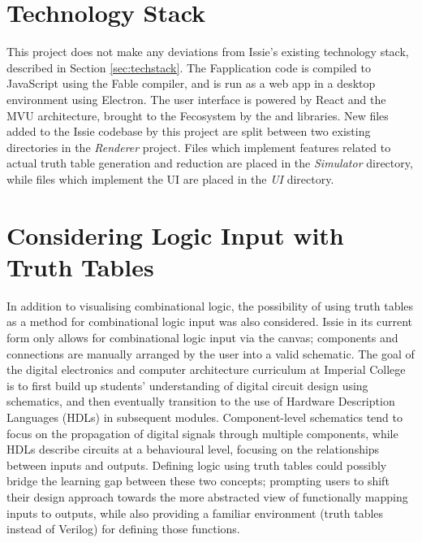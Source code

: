 \section{Technology Stack}
This project does not make any deviations from Issie's existing technology stack, described in Section \ref{sec:techstack}. The F\fsharp application code is compiled to JavaScript using the Fable compiler, and is run as a web app in a desktop environment using Electron. The user interface is powered by React and the MVU architecture, brought to the F\fsharp ecosystem by the  and  libraries. New files added to the Issie codebase by this project are split between two existing directories in the \textit{Renderer} project. Files which implement features related to actual truth table generation and reduction are placed in the \textit{Simulator} directory, while files which implement the UI are placed in the \textit{UI} directory. 



\section{Considering Logic Input with Truth Tables}
In addition to visualising combinational logic, the possibility of using truth tables as a method for combinational logic input was also considered. Issie in its current form only allows for combinational logic input via the canvas; components and connections are manually arranged by the user into a valid schematic. 
The goal of the digital electronics and computer architecture curriculum at Imperial College is to first build up students’ understanding of digital circuit design using schematics, and then eventually transition to the use of Hardware Description Languages (HDLs) in subsequent modules. Component-level schematics tend to focus on the propagation of digital signals through multiple components, while HDLs describe circuits at a behavioural level, focusing on the relationships between inputs and outputs. Defining logic using truth tables could possibly bridge the learning gap between these two concepts; prompting users to shift their design approach towards the more abstracted view of functionally mapping inputs to outputs, while also providing a familiar environment (truth tables instead of Verilog) for defining those functions.

